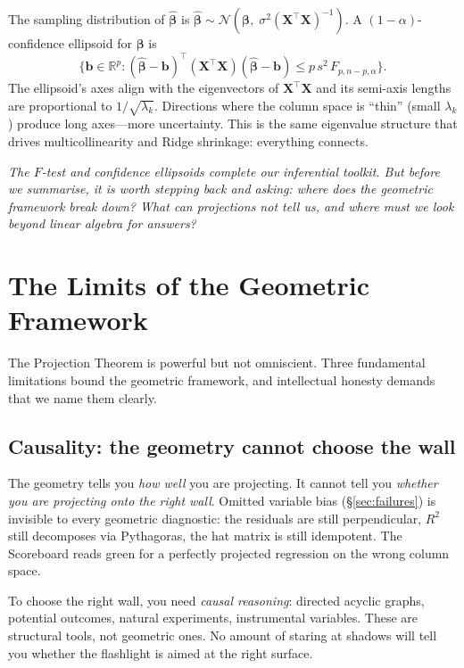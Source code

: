 \documentclass[11pt,a4paper]{article}
\theoremstyle{plain}
\theoremstyle{definition}
\newcommand{\R}{\mathbb{R}}
\newcommand{\bhat}{\hat{\bm{\beta}}}
\newcommand{\bX}{\bm{X}}
\begin{document}
The sampling distribution of $\bhat$ is
$\bhat\sim\mathcal{N}(\bm{\beta},\;\sigma^2(\bX^\top\bX)^{-1})$.
A $(1-\alpha)$-confidence ellipsoid for $\bm{\beta}$ is
\[
  \bigl\{\bm{b}\in\R^p :
  (\bhat-\bm{b})^\top(\bX^\top\bX)(\bhat-\bm{b})
  \le p\,s^2\,F_{p,n-p,\alpha}
  \bigr\}.
\]
The ellipsoid's axes align with the eigenvectors of $\bX^\top\bX$
and its semi-axis lengths are proportional to $1/\sqrt{\lambda_k}$.
Directions where the column space is ``thin'' (small $\lambda_k$)
produce long axes---more uncertainty.
This is the same eigenvalue structure that drives multicollinearity
and Ridge shrinkage: everything connects.

\medskip
\noindent\textit{The $F$-test and confidence ellipsoids complete our
inferential toolkit.
But before we summarise, it is worth stepping back and asking:
where does the geometric framework \emph{break down}?
What can projections not tell us, and where must we look beyond
linear algebra for answers?}


\section{The Limits of the Geometric Framework}\label{sec:limits}

The Projection Theorem is powerful but not omniscient.
Three fundamental limitations bound the geometric framework, and
intellectual honesty demands that we name them clearly.

\subsection{Causality: the geometry cannot choose the wall}

The geometry tells you \emph{how well} you are projecting.
It cannot tell you \emph{whether you are projecting onto the right wall}.
Omitted variable bias (\S\ref{sec:failures}) is invisible to every
geometric diagnostic: the residuals are still perpendicular, $R^2$ still
decomposes via Pythagoras, the hat matrix is still idempotent.
The Scoreboard reads green for a perfectly projected regression on the
wrong column space.

To choose the right wall, you need \emph{causal reasoning}: directed
acyclic graphs, potential outcomes, natural experiments, instrumental
variables. These are structural tools, not geometric ones.
No amount of staring at shadows will tell you whether the flashlight
is aimed at the right surface.
\end{document}
